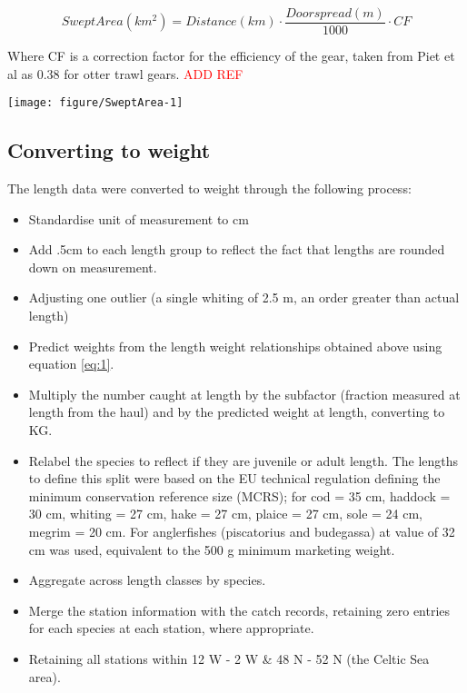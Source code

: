 \documentclass[12pt]{article}\usepackage[]{graphicx}\usepackage[]{color}
\makeatletter
\def\maxwidth{ %
  \ifdim\Gin@nat@width>\linewidth
    \linewidth
  \else
    \Gin@nat@width
  \fi
}
\newenvironment{knitrout}{}{} %
\makeatother
\begin{document}
\begin{equation}
	Swept Area (km^2) = Distance (km) \cdot \frac{Doorspread (m)}{1000}
	\cdot CF 
\end{equation}

Where CF is a correction factor for the efficiency of the gear, taken from Piet
et al as 0.38 for otter trawl gears. \textcolor{red}{ADD REF}

\begin{knitrout}\footnotesize
{}\color{fgcolor}

{\centering \texttt{[image: figure/SweptArea-1]} 

}



\end{knitrout}

\subsection{Converting to weight}

The length data were converted to weight through the following process:

\begin{itemize}
	\item Standardise unit of measurement to cm
	\item Add .5cm to each length group to reflect the fact that lengths
		are rounded down on measurement.
	\item Adjusting one outlier (a single whiting of 2.5 m, an order
		greater than actual length) 
	\item Predict weights from the length weight relationships obtained
		above using equation \ref{eq:1}.
	\item Multiply the number caught at length by the subfactor (fraction
		measured at length from the haul) and by the predicted weight
		at length, converting to KG.
	\item Relabel the species to reflect if they are juvenile or adult
		length. The lengths to define this split were based on the EU
		technical regulation defining the minimum conservation
		reference size (MCRS); for cod = 35 cm, haddock = 30 cm,
		whiting = 27 cm, hake = 27 cm, plaice = 27 cm, sole = 24 cm,
		megrim = 20 cm. For anglerfishes (piscatorius and budegassa) at
		value of 32 cm was used, equivalent to the 500 g minimum
		marketing weight.
	\item Aggregate across length classes by species.
	\item Merge the station information with the catch records, retaining
		zero entries for each species at each station, where
		appropriate.
	\item Retaining all stations within 12 W - 2 W \&  48 N - 52 N (the
		Celtic Sea area).
\end{itemize}
\end{document}
